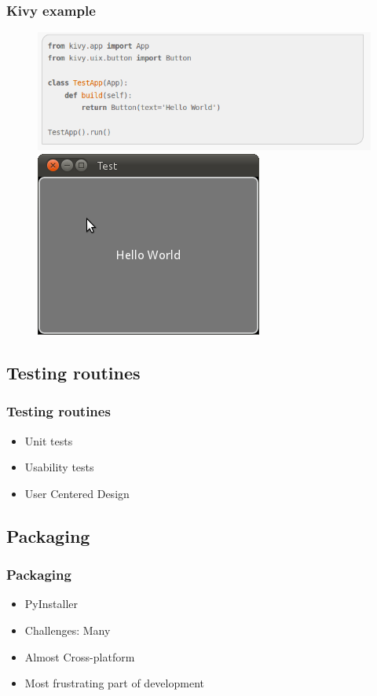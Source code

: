 \documentclass[9pt]{beamer}
\begin{document}
			\begin{frame}
				\frametitle{Kivy example}
				\begin{figure}
				\centering
				\includegraphics[scale=0.3]{Images/kivy_helloworld_code.png}
				\includegraphics[scale=0.3]{Images/kivy_helloworld_result.png}
				\end{figure}
			\end{frame}
			
		\subsection{Testing routines}
			
			\begin{frame}
				\frametitle{Testing routines}
				\begin{itemize}
					\item Unit tests
					\item Usability tests
					\item User Centered Design
				\end{itemize}
			\end{frame}
			
		\subsection{Packaging}
			\begin{frame}
				\frametitle{Packaging}
				\begin{itemize}
					\item PyInstaller
					\item Challenges: Many
					\item Almost Cross-platform
					\item Most frustrating part of development
				\end{itemize}
		    		
			\end{frame}
			
\end{document}
